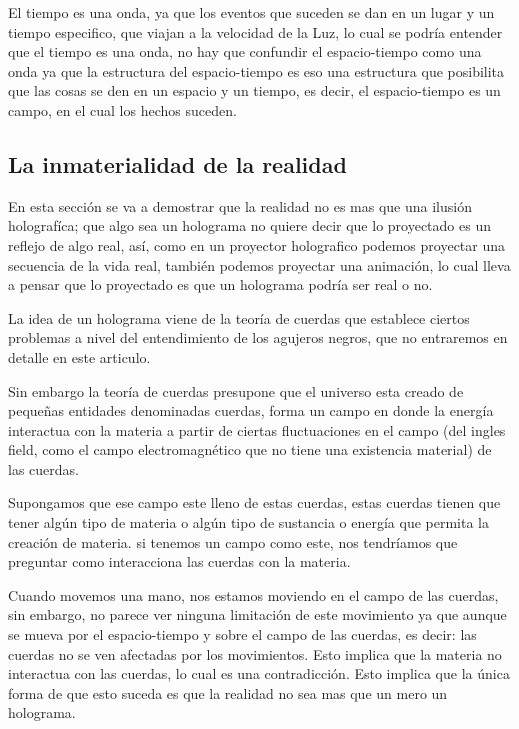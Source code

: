 \documentclass[12pt,letterpaper, a4paper ]{article}
\begin{document}
El tiempo es una onda, ya que los eventos que suceden se dan en un lugar y un tiempo especifico, que viajan a la velocidad de la Luz, lo cual se podría entender que el tiempo es una onda, no hay que confundir el espacio-tiempo como una onda ya que la estructura del espacio-tiempo es eso una estructura que posibilita que las cosas se den en un espacio y un tiempo, es decir, el espacio-tiempo es un campo, en el cual los hechos suceden.


\subsection{La inmaterialidad de la realidad}

En esta sección se va a demostrar que la realidad no es mas que una ilusión holografíca; que algo sea un holograma no quiere decir que lo proyectado es un reflejo de algo real, así, como en un proyector holografico podemos proyectar una secuencia de la vida real, también podemos proyectar una animación, lo cual lleva a pensar que lo proyectado es que un holograma podría ser real o no. 

La idea de un holograma viene de la teoría de cuerdas que establece ciertos problemas a nivel del entendimiento de los agujeros negros, que no entraremos en detalle en este articulo.

Sin embargo la teoría de cuerdas presupone que el universo esta creado de pequeñas entidades denominadas cuerdas, forma un campo en donde la energía interactua con la materia a partir de ciertas fluctuaciones en el campo (del ingles field, como el campo electromagnético que no tiene una existencia material) de las cuerdas.

Supongamos que ese campo este lleno de estas cuerdas, estas cuerdas tienen que tener algún tipo de materia o algún tipo de sustancia o energía que permita la creación de materia. si tenemos un campo como este, nos tendríamos que preguntar como interacciona las cuerdas con la materia. 

Cuando movemos una mano, nos estamos moviendo en el campo de las cuerdas, sin embargo, no parece ver ninguna limitación de este movimiento ya que aunque se mueva por el espacio-tiempo y sobre el campo de las cuerdas, es decir: las cuerdas no se ven afectadas por los movimientos. Esto implica que la materia no interactua con las cuerdas, lo cual es una contradicción. Esto implica que la única forma de que esto suceda es que la realidad no sea mas que un mero un holograma.
\end{document}
